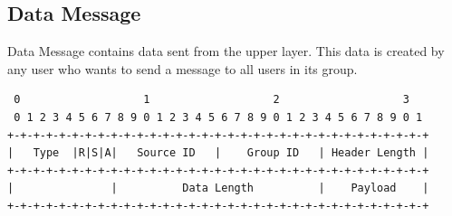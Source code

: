 \documentclass{article}
\begin{document}
\subsection{Data Message}
Data Message contains data sent from the upper layer. This data is created by any user who wants to send a message to all users in its group.
\begin{verbatim}  
 0                   1                   2                   3  
 0 1 2 3 4 5 6 7 8 9 0 1 2 3 4 5 6 7 8 9 0 1 2 3 4 5 6 7 8 9 0 1
+-+-+-+-+-+-+-+-+-+-+-+-+-+-+-+-+-+-+-+-+-+-+-+-+-+-+-+-+-+-+-+-+
|   Type  |R|S|A|   Source ID   |    Group ID   | Header Length |
+-+-+-+-+-+-+-+-+-+-+-+-+-+-+-+-+-+-+-+-+-+-+-+-+-+-+-+-+-+-+-+-+
|               |          Data Length          |    Payload    |
+-+-+-+-+-+-+-+-+-+-+-+-+-+-+-+-+-+-+-+-+-+-+-+-+-+-+-+-+-+-+-+-+
\end{verbatim}
\end{document}
